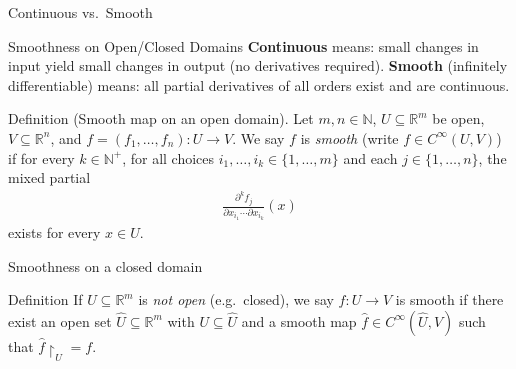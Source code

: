 \begin{frame}{Continuous vs.\ Smooth}
\vspace{-0.3cm}
\begin{block}{Smoothness on Open/Closed Domains}
\textbf{Continuous} means: small changes in input yield small changes in output (no derivatives required).
\textbf{Smooth} (infinitely differentiable) means: all partial derivatives of all orders exist and are continuous.
\end{block}

\vspace{-0.2cm}
\begin{block}{Definition (Smooth map on an open domain).}
Let $m,n\in\mathbb{N}$, $U\subseteq\mathbb{R}^m$ be open, $V\subseteq\mathbb{R}^n$, and $f=(f_1,\dots,f_n):U\to V$.
We say $f$ is \emph{smooth} (write $f\in C^\infty(U,V)$) if for every $k\in\mathbb{N}^+$, for all choices $i_1,\dots,i_k\in\{1,\dots,m\}$ and each $j\in\{1,\dots,n\}$, the mixed partial
\vspace{-0.2cm}
\begin{align*}
\frac{\partial^k f_j}{\partial x_{i_1}\cdots \partial x_{i_k}}(x)
\end{align*}
exists for every $x\in U$.
\end{block}
\end{frame}

\begin{frame}{Smoothness on a closed domain}
    \begin{block}{Definition}
If $U\subseteq\mathbb{R}^m$ is \emph{not open} (e.g.\ closed), we say $f:U\to V$ is smooth if there exist an open set $\widehat{U}\subseteq\mathbb{R}^m$ with $U\subseteq \widehat{U}$ and a smooth map $\widehat{f}\in C^\infty(\widehat{U},V)$ such that $\widehat{f}\!\restriction_{U}=f$.
\begin{center}
\end{center}
\end{block}
\end{frame}

